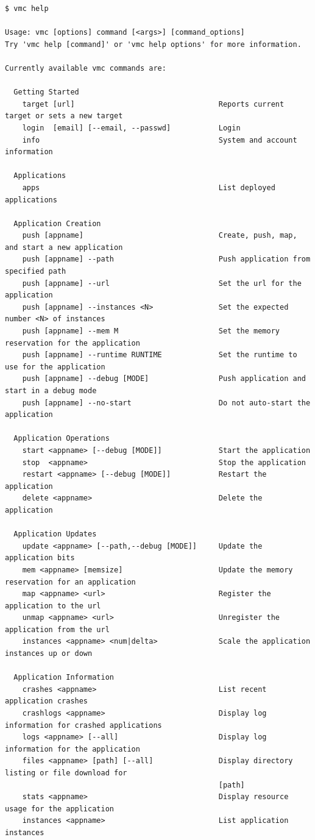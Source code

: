 \lstset{language=bash,caption=Hasil opsi help dari vmc}
\begin{lstlisting}
$ vmc help 

Usage: vmc [options] command [<args>] [command_options] 
Try 'vmc help [command]' or 'vmc help options' for more information. 

Currently available vmc commands are: 

  Getting Started 
    target [url]                                 Reports current target or sets a new target 
    login  [email] [--email, --passwd]           Login 
    info                                         System and account information 

  Applications 
    apps                                         List deployed applications 

  Application Creation 
    push [appname]                               Create, push, map, and start a new application 
    push [appname] --path                        Push application from specified path 
    push [appname] --url                         Set the url for the application 
    push [appname] --instances <N>               Set the expected number <N> of instances 
    push [appname] --mem M                       Set the memory reservation for the application 
    push [appname] --runtime RUNTIME             Set the runtime to use for the application 
    push [appname] --debug [MODE]                Push application and start in a debug mode 
    push [appname] --no-start                    Do not auto-start the application 

  Application Operations 
    start <appname> [--debug [MODE]]             Start the application 
    stop  <appname>                              Stop the application 
    restart <appname> [--debug [MODE]]           Restart the application 
    delete <appname>                             Delete the application 

  Application Updates 
    update <appname> [--path,--debug [MODE]]     Update the application bits 
    mem <appname> [memsize]                      Update the memory reservation for an application 
    map <appname> <url>                          Register the application to the url 
    unmap <appname> <url>                        Unregister the application from the url 
    instances <appname> <num|delta>              Scale the application instances up or down 

  Application Information 
    crashes <appname>                            List recent application crashes 
    crashlogs <appname>                          Display log information for crashed applications 
    logs <appname> [--all]                       Display log information for the application 
    files <appname> [path] [--all]               Display directory listing or file download for 
                                                 [path] 
    stats <appname>                              Display resource usage for the application 
    instances <appname>                          List application instances 


\end{lstlisting}
